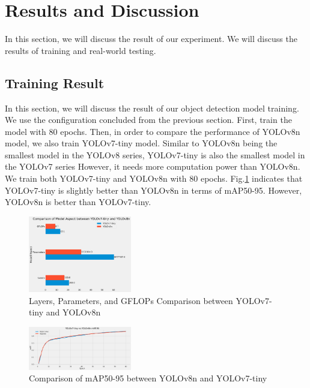 \documentclass[conference]{IEEEtran}
\begin{document}
\section{Results and Discussion}
In this section, we will discuss the result of our experiment. We will discuss the results of training and real-world testing.
\subsection{Training Result}
In this section, we will discuss the result of our object detection model training. We use the configuration concluded from the previous section. First, train the model with 80 epochs.
Then, in order to compare the performance of YOLOv8n model, we also train YOLOv7-tiny model.
Similar to YOLOv8n being the smallest model in the YOLOv8 series, YOLOv7-tiny is also the smallest model in the YOLOv7 series However, it needs more computation power than YOLOv8n. We train both YOLOv7-tiny and YOLOv8n with 80 epochs.
Fig.\ref{fig:mAP_comparison} indicates that YOLOv7-tiny is slightly better than YOLOv8n in terms of mAP50-95. However, YOLOv8n is better than YOLOv7-tiny.
\begin{figure}

\centering
\includegraphics[width=0.4\textwidth,keepaspectratio]{YOLOv7-tinyvsYOLOv8n_model_aspect.png}    
\caption{Layers, Parameters, and GFLOPs Comparison between YOLOv7-tiny and YOLOv8n}
\end{figure}

\begin{figure}[h]
\centering
\includegraphics[width=0.4\textwidth,keepaspectratio]{YOLOv7-tinyvsYOLOv8n.png}
\caption{Comparison of mAP50-95 between YOLOv8n and YOLOv7-tiny}
\label{fig:mAP_comparison}
\end{figure}
\end{document}

